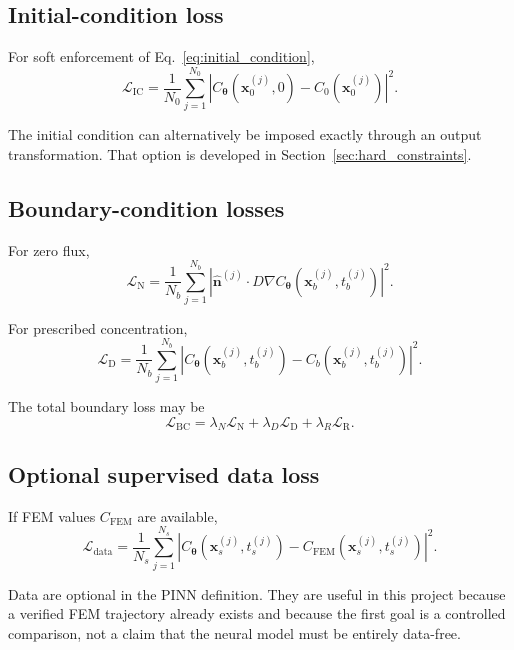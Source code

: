 \documentclass[11pt]{article}
\newcommand{\thetav}{\bm{\theta}}
\newcommand{\xv}{\bm{x}}
\newcommand{\Cnet}{C_{\thetav}}
\newcommand{\Lic}{\mathcal{L}_{\mathrm{IC}}}
\newcommand{\Lbc}{\mathcal{L}_{\mathrm{BC}}}
\newcommand{\Ldata}{\mathcal{L}_{\mathrm{data}}}
\begin{document}
\subsection{Initial-condition loss}

For soft enforcement of Eq.~\eqref{eq:initial_condition},
\begin{equation}
\Lic
=
\frac{1}{N_0}
\sum_{j=1}^{N_0}
\left|
\Cnet(\xv_0^{(j)},0)-C_0(\xv_0^{(j)})
\right|^2.
\label{eq:ic_loss}
\end{equation}

The initial condition can alternatively be imposed exactly through an output transformation. That option is developed in Section~\ref{sec:hard_constraints}.

\subsection{Boundary-condition losses}

For zero flux,
\begin{equation}
\mathcal{L}_{\mathrm{N}}
=
\frac{1}{N_b}
\sum_{j=1}^{N_b}
\left|
\hat{\mathbf n}^{(j)}\cdot
D\nabla\Cnet(\xv_b^{(j)},t_b^{(j)})
\right|^2.
\label{eq:neumann_loss}
\end{equation}

For prescribed concentration,
\begin{equation}
\mathcal{L}_{\mathrm{D}}
=
\frac{1}{N_b}
\sum_{j=1}^{N_b}
\left|
\Cnet(\xv_b^{(j)},t_b^{(j)})-C_b(\xv_b^{(j)},t_b^{(j)})
\right|^2.
\label{eq:dirichlet_loss}
\end{equation}

The total boundary loss may be
\begin{equation}
\Lbc
=
\lambda_N\mathcal{L}_{\mathrm N}
+\lambda_D\mathcal{L}_{\mathrm D}
+\lambda_R\mathcal{L}_{\mathrm R}.
\end{equation}

\subsection{Optional supervised data loss}

If FEM values $C_{\mathrm{FEM}}$ are available,
\begin{equation}
\Ldata
=
\frac{1}{N_s}
\sum_{j=1}^{N_s}
\left|
\Cnet(\xv_s^{(j)},t_s^{(j)})
-C_{\mathrm{FEM}}(\xv_s^{(j)},t_s^{(j)})
\right|^2.
\label{eq:data_loss}
\end{equation}

Data are optional in the PINN definition. They are useful in this project because a verified FEM trajectory already exists and because the first goal is a controlled comparison, not a claim that the neural model must be entirely data-free.
\end{document}
